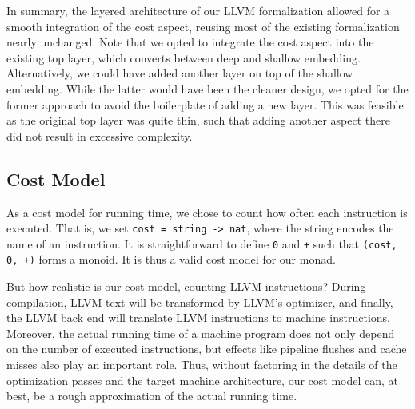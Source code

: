 \documentclass[acmsmall]{acmart}
\newcommand{\is}{\lstinline[language=isabelle]}
\begin{document}
In summary, the layered architecture of our LLVM formalization allowed for a smooth integration of the cost aspect, reusing most of the existing formalization nearly unchanged. 
Note that we opted to integrate the cost aspect into the existing top layer, which converts between deep and shallow embedding. Alternatively, we could have added another layer on top of the shallow embedding. While the latter would have been the cleaner design, we opted for the former approach to avoid the boilerplate of adding a new layer. This was feasible as the original top layer was quite thin, such that adding another aspect there did not result in excessive complexity.

\subsection{Cost Model}\label{sec:llvm-cost-model}
As a cost model for running time, we chose to count how often each instruction is executed. 
That is, we set \is{cost = string -> nat}, where the string encodes the name of an instruction. It is straightforward to define \is{0} and \is{+} such that \is{(cost, 0, +)} forms a 
monoid.
It is thus a valid cost model for our monad.

But how realistic is our cost model, counting LLVM instructions? 
During compilation, LLVM text will be transformed by LLVM's optimizer, and finally, the LLVM back end will translate LLVM instructions to machine instructions. 
Moreover, the actual running time of a machine program does not only depend on the number of executed instructions, 
but effects like pipeline flushes and cache misses also play an important role.
Thus, without factoring in the details of the optimization passes and the target machine architecture, 
our cost model can, at best, be a rough approximation of the actual running time.


\end{document}
